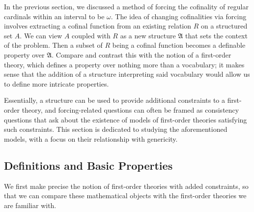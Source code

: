 \documentclass[12pt]{article}
\numberwithin{equation}{section}
\begin{document}
In the previous section, we discussed a method of forcing the cofinality of regular cardinals within an interval to be $\omega$. The idea of changing cofinalities via forcing involves extracting a cofinal function from an existing relation $R$ on a structured set $A$. We can view $A$ coupled with $R$ as a new structure $\mathfrak{A}$ that sets the context of the problem. Then a subset of $R$ being a cofinal function becomes a definable property over $\mathfrak{A}$. Compare and contrast this with the notion of a first-order theory, which defines a property over nothing more than a vocabulary; it makes sense that the addition of a structure interpreting said vocabulary would allow us to define more intricate properties. 

Essentially, a structure can be used to provide additional constraints to a first-order theory, and forcing-related questions can often be framed as consistency questions that ask about the existence of models of first-order theories satisfying such constraints. This section is dedicated to studying the aforementioned models, with a focus on their relationship with genericity.

\subsection{Definitions and Basic Properties}\label{subs51}

We first make precise the notion of first-order theories with added constraints, so that we can compare these mathematical objects with the first-order theories we are familiar with. 
\end{document}
